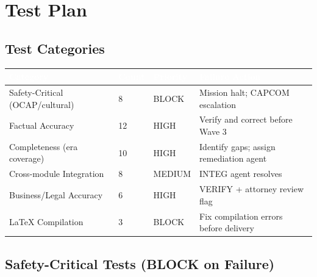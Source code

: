 \documentclass[11pt,letterpaper]{article}
\newcommand{\tableheader}[1]{\textbf{\sffamily\textcolor{white}{#1}}}
\begin{document}
\section{Test Plan}

\subsection{Test Categories}

\begin{tabularx}{\textwidth}{L{3.5cm}C{1.5cm}L{2cm}X}
\toprule
{}
\tableheader{Category} & \tableheader{Count} & \tableheader{Priority} & \tableheader{Failure Action} \\
\midrule
Safety-Critical (OCAP/cultural) & 8 & BLOCK & Mission halt; CAPCOM escalation \\
Factual Accuracy & 12 & HIGH & Verify and correct before Wave 3 \\
Completeness (era coverage) & 10 & HIGH & Identify gaps; assign remediation agent \\
Cross-module Integration & 8 & MEDIUM & INTEG agent resolves \\
Business/Legal Accuracy & 6 & HIGH & VERIFY + attorney review flag \\
LaTeX Compilation & 3 & BLOCK & Fix compilation errors before delivery \\
\bottomrule
\end{tabularx}

\subsection{Safety-Critical Tests (BLOCK on Failure)}
\end{document}
